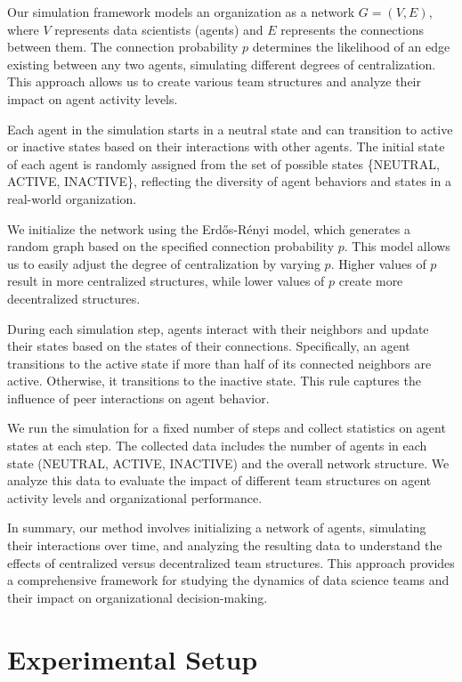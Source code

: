 \documentclass{article} %
\begin{document}
Our simulation framework models an organization as a network \( G = (V, E) \), where \( V \) represents data scientists (agents) and \( E \) represents the connections between them. The connection probability \( p \) determines the likelihood of an edge existing between any two agents, simulating different degrees of centralization. This approach allows us to create various team structures and analyze their impact on agent activity levels.

Each agent in the simulation starts in a neutral state and can transition to active or inactive states based on their interactions with other agents. The initial state of each agent is randomly assigned from the set of possible states \{NEUTRAL, ACTIVE, INACTIVE\}, reflecting the diversity of agent behaviors and states in a real-world organization.

We initialize the network using the Erdős-Rényi model, which generates a random graph based on the specified connection probability \( p \). This model allows us to easily adjust the degree of centralization by varying \( p \). Higher values of \( p \) result in more centralized structures, while lower values of \( p \) create more decentralized structures.

During each simulation step, agents interact with their neighbors and update their states based on the states of their connections. Specifically, an agent transitions to the active state if more than half of its connected neighbors are active. Otherwise, it transitions to the inactive state. This rule captures the influence of peer interactions on agent behavior.

We run the simulation for a fixed number of steps and collect statistics on agent states at each step. The collected data includes the number of agents in each state (NEUTRAL, ACTIVE, INACTIVE) and the overall network structure. We analyze this data to evaluate the impact of different team structures on agent activity levels and organizational performance.

In summary, our method involves initializing a network of agents, simulating their interactions over time, and analyzing the resulting data to understand the effects of centralized versus decentralized team structures. This approach provides a comprehensive framework for studying the dynamics of data science teams and their impact on organizational decision-making.

\section{Experimental Setup}
\label{sec:experimental}
\end{document}
